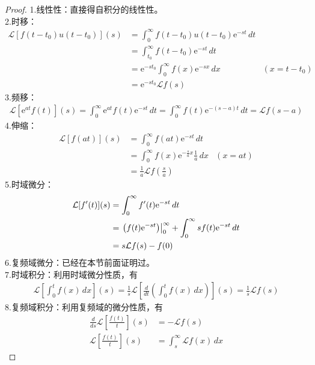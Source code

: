 \begin{proof}
    1.线性性：直接得自积分的线性性。\\
    2.时移：\begin{align*}
        \mathcal{L} [f(t-t_0)u(t-t_0)](s)&=\int_0^{\infty}f(t-t_0)u(t-t_0)\mathrm{e}^{-st}\,dt\\
        &=\int_{t_0}^{\infty}f(t-t_0)\mathrm{e}^{-st}\,dt\\
        &=\mathrm{e}^{-s t_0}\int_0^{\infty}f(x)\mathrm{e}^{-s x}\,dx&( x=t-t_0)\\
        &=\mathrm{e}^{-s t_0}\mathcal{L} f(s)
    \end{align*}
    3.频移：\begin{align*}
        \mathcal{L} [\mathrm{e}^{a t}f(t)](s)=\int_0^{\infty}\mathrm{e}^{a t}f(t)\mathrm{e}^{-st}\,dt=\int_0^{\infty}f(t)\mathrm{e}^{-(s-a)t}\,dt=\mathcal{L} f(s-a)
    \end{align*}
    4.伸缩：\begin{align*}
        \mathcal{L} [f(at)](s)&=\int_0^{\infty}f(at)\mathrm{e}^{-st}\,dt\\
        &=\int_0^{\infty}f(x)\mathrm{e}^{-\frac{s}{a}x}\frac{1}{a}\,dx&(x=at)\\
        &=\frac{1}{a}\mathcal{L} f\left(\frac{s}{a}\right)
    \end{align*}
    5.时域微分：\begin{align*}
        \mathcal{L} [f'(t)](s)&=\int_0^{\infty}f'(t)\mathrm{e}^{-st}\,dt\\
        &=\left.\left(f(t)\mathrm{e}^{-st}\right)\right|_{0}^{\infty}+\int_0^{\infty}sf(t)\mathrm{e}^{-st}\,dt\\
        &=s\mathcal{L} f(s)-f(0)
    \end{align*}
    6.复频域微分：已经在本节前面证明过。\\
    7.时域积分：利用时域微分性质，有
    \begin{align*}
        \mathcal{L} \left[\int_0^t f(x)\,dx\right](s)=\frac{1}{s}\mathcal{L} \left[\frac{d}{dt}\left(\int_0^t f(x)\,dx\right)\right](s)=\frac{1}{s}\mathcal{L} f(s)
    \end{align*}
    8.复频域积分：利用复频域的微分性质，有
    \begin{align*}
        \frac{d}{ds}\mathcal{L} \left[\frac{f(t)}{t}\right](s)&=-\mathcal{L} f(s)\\
        \mathcal{L} \left[\frac{f(t)}{t}\right](s)&=\int_s^{\infty}\mathcal{L}f(x)\,dx
    \end{align*}
\end{proof}

